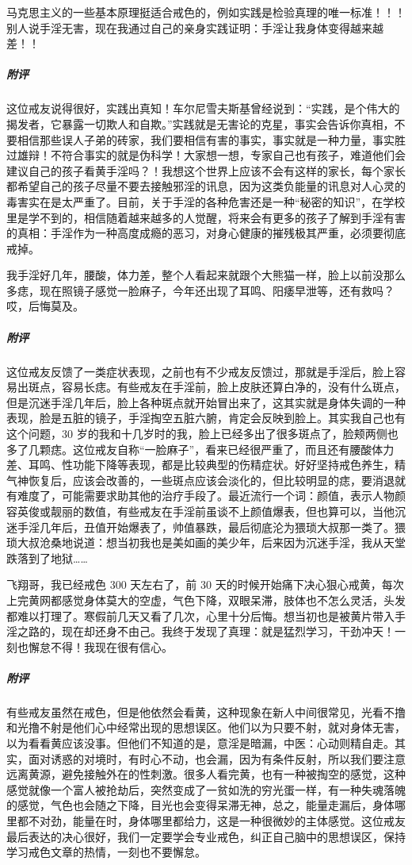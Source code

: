 \begin{case}
    马克思主义的一些基本原理挺适合戒色的，例如实践是检验真理的唯一标准！！！别人说手淫无害，现在我通过自己的亲身实践证明：手淫让我身体变得越来越差！！
    \subparagraph{附评} 这位戒友说得很好，实践出真知！车尔尼雪夫斯基曾经说到：“实践，是个伟大的揭发者，它暴露一切欺人和自欺。”实践就是无害论的克星，事实会告诉你真相，不要相信那些误人子弟的砖家，我们要相信有害的事实，事实就是一种力量，事实胜过雄辩！不符合事实的就是伪科学！大家想一想，专家自己也有孩子，难道他们会建议自己的孩子看黄手淫吗？！我想这个世界上应该不会有这样的家长，每个家长都希望自己的孩子尽量不要去接触邪淫的讯息，因为这类负能量的讯息对人心灵的毒害实在是太严重了。目前，关于手淫的各种危害还是一种“秘密的知识”，在学校里是学不到的，相信随着越来越多的人觉醒，将来会有更多的孩子了解到手淫有害的真相：手淫作为一种高度成瘾的恶习，对身心健康的摧残极其严重，必须要彻底戒掉。
\end{case}

\begin{case}
    我手淫好几年，腰酸，体力差，整个人看起来就跟个大熊猫一样，脸上以前没那么多痣，现在照镜子感觉一脸麻子，今年还出现了耳鸣、阳痿早泄等，还有救吗？哎，后悔莫及。
    \subparagraph{附评} 这位戒友反馈了一类症状表现，之前也有不少戒友反馈过，那就是手淫后，脸上容易出斑点，容易长痣。有些戒友在手淫前，脸上皮肤还算白净的，没有什么斑点，但是沉迷手淫几年后，脸上各种斑点就开始冒出来了，这其实就是身体失调的一种表现，脸是五脏的镜子，手淫掏空五脏六腑，肯定会反映到脸上。其实我自己也有这个问题，30 岁的我和十几岁时的我，脸上已经多出了很多斑点了，脸颊两侧也多了几颗痣。这位戒友自称“一脸麻子”，看来已经很严重了，而且还有腰酸体力差、耳鸣、性功能下降等表现，都是比较典型的伤精症状。好好坚持戒色养生，精气神恢复后，应该会改善的，一些斑点应该会淡化的，但比较明显的痣，要消退就有难度了，可能需要求助其他的治疗手段了。最近流行一个词：颜值，表示人物颜容英俊或靓丽的数值，有些戒友在手淫前虽谈不上颜值爆表，但也算可以，当他沉迷手淫几年后，丑值开始爆表了，帅值暴跌，最后彻底沦为猥琐大叔那一类了。猥琐大叔沧桑地说道：想当初我也是美如画的美少年，后来因为沉迷手淫，我从天堂跌落到了地狱……
\end{case}

\begin{case}
    飞翔哥，我已经戒色 300 天左右了，前 30 天的时候开始痛下决心狠心戒黄，每次上完黄网都感觉身体莫大的空虚，气色下降，双眼呆滞，肢体也不怎么灵活，头发都难以打理了。寒假前几天又看了几次，心里十分后悔。想当初也是被黄片带入手淫之路的，现在却还身不由己。我终于发现了真理：就是猛烈学习，干劲冲天！一刻也懈怠不得！我现在很有信心。
    \subparagraph{附评} 有些戒友虽然在戒色，但是他依然会看黄，这种现象在新人中间很常见，光看不撸和光撸不射是他们心中经常出现的思想误区。他们以为只要不射，就对身体无害，以为看看黄应该没事。但他们不知道的是，意淫是暗漏，中医：心动则精自走。其实，面对诱惑的对境时，有时心不动，也会漏，因为有条件反射，所以我们要注意远离黄源，避免接触外在的性刺激。很多人看完黄，也有一种被掏空的感觉，这种感觉就像一个富人被抢劫后，突然变成了一贫如洗的穷光蛋一样，有一种失魂落魄的感觉，气色也会随之下降，目光也会变得呆滞无神，总之，能量走漏后，身体哪里都不对劲，能量在时，身体哪里都给力，这是一种很微妙的主体感觉。这位戒友最后表达的决心很好，我们一定要学会专业戒色，纠正自己脑中的思想误区，保持学习戒色文章的热情，一刻也不要懈怠。
\end{case}


